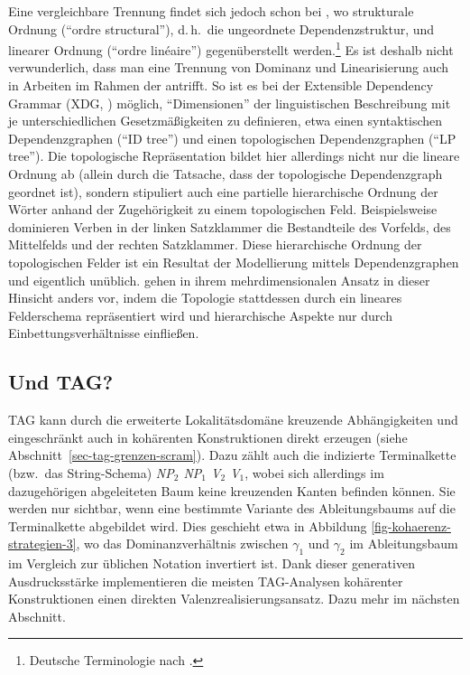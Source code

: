 Eine vergleichbare Trennung findet sich jedoch schon bei \cite{Tesniere:59}, wo strukturale Ordnung ("`ordre structural"'), d.\,h.\ die ungeordnete Dependenzstruktur, und linearer Ordnung ("`ordre lin\'eaire"') gegenüberstellt werden.\footnote{Deutsche Terminologie nach \citet[33]{Agel:00}.} Es ist deshalb nicht verwunderlich, dass man eine Trennung von Dominanz und Linearisierung auch in Arbeiten im Rahmen der  antrifft. So ist es bei der Extensible Dependency Grammar (XDG, \citealt{Duchier:Debusmann:01, Debusmann:etal:04}) möglich, "`Dimensionen"' der linguistischen Beschreibung mit je unterschiedlichen Gesetzmä\ss igkeiten zu definieren, etwa einen syntaktischen Dependenzgraphen ("`ID tree"') und einen topologischen Dependenzgraphen ("`LP tree"'). Die topologische Repräsentation bildet hier allerdings nicht nur die lineare Ordnung ab (allein durch die Tatsache, dass der topologische Dependenzgraph geordnet ist), sondern stipuliert auch eine partielle hierarchische Ordnung der Wörter anhand der Zugehörigkeit zu einem topologischen Feld. Beispielsweise dominieren Verben in der linken Satzklammer die Bestandteile des Vorfelds, des Mittelfelds und der rechten Satzklammer. Diese hierarchische Ordnung der topologischen Felder ist ein Resultat der Modellierung mittels Dependenzgraphen und eigentlich unüblich. \cite{Gerdes:Kahane:01} gehen in ihrem mehrdimensionalen Ansatz in dieser Hinsicht anders vor, indem die Topologie stattdessen durch ein lineares Felderschema repräsentiert wird und hierarchische Aspekte nur durch Einbettungsverhältnisse einflie\ss en. 


\subsection{Und TAG?}

TAG kann durch die erweiterte Lokalitätsdomäne kreuzende Abhängigkeiten und eingeschränkt auch  in kohärenten Konstruktionen direkt erzeugen (siehe Abschnitt~\ref{sec-tag-grenzen-scram}). Dazu zählt auch die indizierte Terminalkette (bzw.\ das String-Schema) {\it NP$_2$ NP$_1$ V$_2$ V$_1$}, wobei sich allerdings im dazugehörigen abgeleiteten Baum keine kreuzenden Kanten befinden können. Sie werden nur sichtbar, wenn eine bestimmte Variante des Ableitungsbaums auf die Terminalkette abgebildet wird. Dies geschieht etwa in Abbildung \ref{fig-kohaerenz-strategien-3}, wo das Dominanzverhältnis zwischen $\gamma_1$ und $\gamma_2$ im Ableitungsbaum im Vergleich zur üblichen Notation invertiert ist. Dank dieser generativen Ausdrucksstärke implementieren die meisten TAG-Analysen kohärenter Konstruktionen einen direkten Valenzrealisierungsansatz. Dazu mehr im nächsten Abschnitt.   


